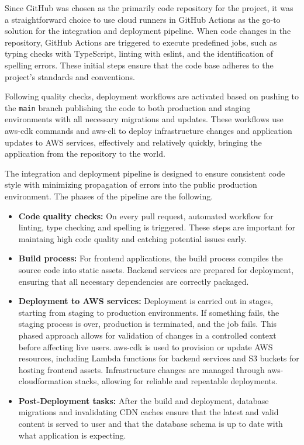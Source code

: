 Since GitHub was chosen as the primarily code repository for the project, it was a straightforward choice to use cloud runners in GitHub Actions as the go-to solution for the integration and deployment pipeline.
When code changes in the repository, GitHub Actions are triggered to execute predefined jobs, such as typing checks with TypeScript, linting with \gls{eslint}, and the identification of spelling errors.
These initial steps ensure that the code base adheres to the project's standards and conventions.

Following quality checks, deployment workflows are activated based on pushing to the \texttt{main} branch publishing the code to both production and staging environments with all necessary migrations and updates.
These workflows use \gls{aws-cdk} commands and \gls{aws-cli} to deploy infrastructure changes and application updates to \ac{AWS} services, effectively and relatively quickly, bringing the application from the repository to the world.


The integration and deployment pipeline is designed to ensure consistent code style with minimizing propagation of errors into the public production environment.
The phases of the pipeline are the following.
\begin{itemize}
    \item \textbf{Code quality checks:} On every pull request, automated workflow for linting, type checking and spelling is triggered. These steps are important for maintaing high code quality and catching potential issues early.
    \item \textbf{Build process:} For frontend applications, the build process compiles the source code into static assets. Backend services are prepared for deployment, ensuring that all necessary dependencies are correctly packaged.
    \item \textbf{Deployment to AWS services:} Deployment is carried out in stages, starting from staging to production environments. If something fails, the staging process is over, production is terminated, and the job fails. This phased approach allows for validation of changes in a controlled context before affecting live users. \gls{aws-cdk} is used to provision or update \ac{AWS} resources, including Lambda functions for backend services and \ac{S3} buckets for hosting frontend assets. Infrastructure changes are managed through \gls{aws-cloudformation} stacks, allowing for reliable and repeatable deployments.
    \item \textbf{Post-Deployment tasks:} After the build and deployment, database migrations and invalidating CDN caches ensure that the latest and valid content is served to user and that the database schema is up to date with what application is expecting.
\end{itemize}

